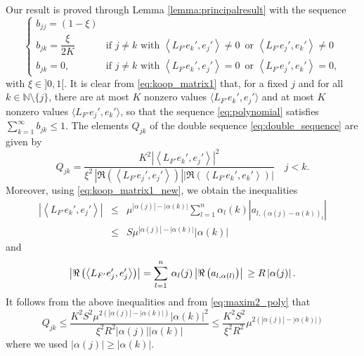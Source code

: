 \documentclass{article}
\begin{document}
Our result is proved through Lemma \ref{lemma:principalresult} with the sequence
{\small \begin{equation}\label{eq:polynomial}
\begin{cases}b_{jj}=(1-\xi)\\ b_{jk}=\dfrac{\xi}{2 K} & \textrm{if } j\neq k \textrm{ with }\left\langle  L_{F'}e_k',e_j'\right\rangle \neq 0 \, \textrm{ or } \left\langle  L_{F'}e_j',e_k'\right\rangle \neq 0 \\
 b_{jk}=0, & \textrm{if } j\neq k \textrm{ with } \left\langle  L_{F'}e_k',e_j'\right\rangle = 0\, \textrm{ or } \left\langle L_{F'}e_j',e_k'\right\rangle = 0 , \end{cases}
\end{equation}}
with $\xi\in]0,1[$. It is clear from \eqref{eq:koop_matrix1} that, for a fixed $j$ and for all $k\in \mathbb{N}\setminus\{j\}$, there are at most $K$ nonzero values $\langle  L_{F'}e_k',e_j'\rangle$ and at most $K$ nonzero values $\langle  L_{F'}e_j',e_k'\rangle$, so that the sequence \eqref{eq:polynomial} satisfies $\sum_{k=1}^\infty b_{jk} \leq 1$. The elements $Q_{jk}$ of the double sequence \eqref{eq:double_sequence} are given by
\begin{equation}\label{eq:maxim2_poly}
Q_{jk}= 
     \dfrac{K^2 \left| \left\langle  L_{F'}e_k',e_j'\right\rangle \right|^2}{\xi^2 \, \left|\Re\left(\left\langle L_{F'}e_j', e_j' \right\rangle\right)\right|\left|\Re\left(\left\langle L_{F'} e_k', e_k' \right\rangle\right)\right|} \quad j<k.
\end{equation}
Moreover, using \eqref{eq:koop_matrix1_new}, we obtain the inequalities
\begin{eqnarray*}
\left| \left\langle  L_{F'}e_k',e_j'\right\rangle \right| & \leq & \mu^{|\alpha(j) |- |\alpha(k) |}
\sum_{l=1}^n \alpha_l(k)  \left| a_{l,(\alpha(j)-\alpha(k))_l}\right|\\
 & \leq & S \mu^{|\alpha(j) |- |\alpha(k) |}
\left| \alpha(k)\right|
\end{eqnarray*}
and 
\begin{equation*}
\left|\Re\left(\left\langle L_{F'}e_j', e_j' \right\rangle\right)\right| =  \sum_{l=1}^{n}\, \alpha_l(j) \left|\Re \left(a_{l,\alpha(l)}\right) \right| \\
\geq  R \left| \alpha (j)\right|.
\end{equation*}
It follows from the above inequalities and from \eqref{eq:maxim2_poly} that
{\small 
\begin{equation*}
Q_{jk} \leq   \dfrac{ K^2 S^2 \mu^{2(|\alpha(j) |- |\alpha(k) |)}
\left| \alpha(k)\right|^2}{\xi^2 R^2 \left| \alpha (j)\right| \left| \alpha (k)\right|}
\leq   \dfrac{ K^2 S^2 }{\xi^2 R^2 } \mu^{2 \left(|\alpha(j) |- |\alpha(k) |\right)}
\end{equation*}}
where we used $\left| \alpha (j)\right| \geq \left| \alpha (k)\right|$.
\end{document}
